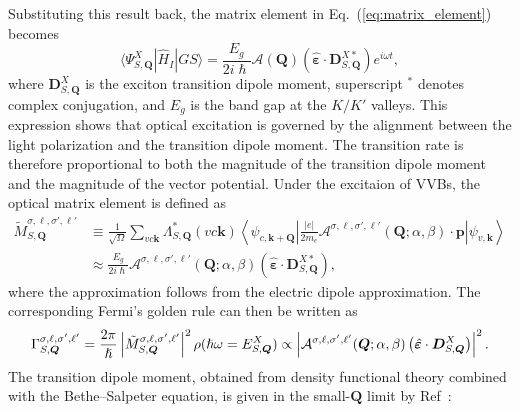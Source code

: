 Substituting this result back, the matrix element in Eq.~(\ref{eq:matrix_element})~\cite{peng2022tailoring, sanchez2024enhanced} becomes
\begin{equation}
\langle\Psi_{S, \boldsymbol{Q}}^{X}|\hat{H}_I|GS\rangle 
=
\frac{E_g}{2i\hslash}
\mathcal{A}(\boldsymbol{Q}) 
\left(
\hat{\boldsymbol{\varepsilon}} \cdot 
\boldsymbol{D}^{X*}_{S, \boldsymbol{Q}}
\right) e^{i\omega t},
\label{firstmatrixelement}
\end{equation}
where $\boldsymbol{D}^{X}_{S, \boldsymbol{Q}}$ is the exciton transition dipole moment, superscript $^*$ denotes complex conjugation, and $E_g$ is the band gap at the $K/K'$ valleys. This expression shows that optical excitation is governed by the alignment between the light polarization and the transition dipole moment. The transition rate is therefore proportional to both the magnitude of the transition dipole moment and the magnitude of the vector potential. Under the excitaion of VVBs, the optical matrix element is defined as
\begin{align}
\tilde{M}^{\sigma, \ell, \sigma', \ell'}_{S, \boldsymbol{Q}}
&\equiv
\frac{1}{\sqrt{\Omega}} 
\sum_{vc\boldsymbol{k}} 
\Lambda^*_{S,\boldsymbol{Q}}(vc\boldsymbol{k}) 
\left\langle
\psi_{c, \boldsymbol{k}+\boldsymbol{Q}}
\left|
\frac{|e|}{2m_e}
\boldsymbol{\mathcal{A}}^{\sigma, \ell, \sigma', \ell'}(\boldsymbol{Q};\alpha,\beta)
\cdot
\boldsymbol{p}
\right|
\psi_{v, \boldsymbol{k}}
\right\rangle \nonumber \\
&\approx
\frac{E_g}{2i\hslash}
\mathcal{A}^{\sigma, \ell, \sigma', \ell'}(\boldsymbol{Q};\alpha,\beta)
\left(
\hat{\boldsymbol{\varepsilon}} \cdot 
\boldsymbol{D}^{X*}_{S, \boldsymbol{Q}}
\right),
\label{matrixelement}
\end{align}
where the approximation follows from the electric dipole approximation. The corresponding Fermi's golden rule can then be written as~\cite{sanchez2024enhanced}
\begin{equation}
\Gamma^{\sigma, \ell, \sigma', \ell'}_{S, \boldsymbol{Q}}
=
\frac{2\pi}{\hslash}
\left|
\tilde{M}^{\sigma, \ell, \sigma', \ell'}_{S, \boldsymbol{Q}}
\right|^2
\rho(\hslash\omega=E^X_{S, \boldsymbol{Q}}) \\  
\propto
\left|
\mathcal{A}^{\sigma, \ell, \sigma', \ell'}(\boldsymbol{Q};\alpha,\beta)
\left(\hat{\boldsymbol{\varepsilon}} \cdot 
\boldsymbol{D}^{X}_{S, \boldsymbol{Q}}
\right)\right|^2. \label{transitionrate}
\end{equation}
The transition dipole moment, obtained from density functional theory  combined with the Bethe--Salpeter equation, is given in the small-$\boldsymbol{Q}$ limit by Ref~\cite{peng2022tailoring, sanchez2024enhanced}:
